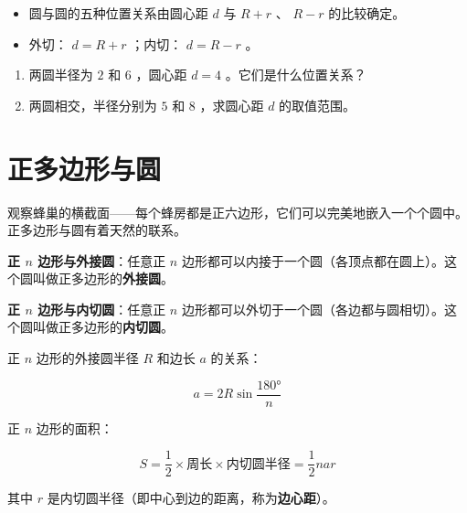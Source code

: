 \begin{keytakeaway}


\begin{itemize}
  \item 圆与圆的五种位置关系由圆心距 $d$ 与 $R + r$ 、 $R - r$ 的比较确定。
  \item 外切： $d = R + r$ ；内切： $d = R - r$ 。
\end{itemize}


\end{keytakeaway}

\begin{practice}


\begin{enumerate}
  \item 两圆半径为 $2$ 和 $6$ ，圆心距 $d = 4$ 。它们是什么位置关系？
  \item 两圆相交，半径分别为 $5$ 和 $8$ ，求圆心距 $d$ 的取值范围。
\end{enumerate}


\end{practice}



\section*{正多边形与圆}


\begin{explore}


观察蜂巢的横截面——每个蜂房都是正六边形，它们可以完美地嵌入一个个圆中。正多边形与圆有着天然的联系。

\end{explore}

\begin{understand}


\textbf{正 $n$ 边形与外接圆}：任意正 $n$ 边形都可以内接于一个圆（各顶点都在圆上）。这个圆叫做正多边形的\textbf{外接圆}。

\textbf{正 $n$ 边形与内切圆}：任意正 $n$ 边形都可以外切于一个圆（各边都与圆相切）。这个圆叫做正多边形的\textbf{内切圆}。

正 $n$ 边形的外接圆半径 $R$ 和边长 $a$ 的关系：

\[
a = 2R \sin\frac{180°}{n}
\]


正 $n$ 边形的面积：

\[
S = \frac{1}{2} \times \text{周长} \times \text{内切圆半径} = \frac{1}{2} n a r
\]


其中 $r$ 是内切圆半径（即中心到边的距离，称为\textbf{边心距}）。

\end{understand}

